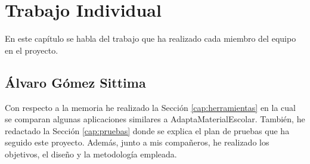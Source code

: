 \chapter{Trabajo Individual}
\label{cap:TrabajoIndividual}

En este capítulo se habla del trabajo que ha realizado cada miembro del equipo en el proyecto.

\section{Álvaro Gómez Sittima}
Con respecto a la memoria he realizado la Sección \ref{cap:herramientas} en la cual se comparan algunas aplicaciones similares a AdaptaMaterialEscolar. También, he redactado la Sección \ref{cap:pruebas} donde se explica el plan de pruebas que ha seguido este proyecto. Además, junto a mis compañeros, he realizado los objetivos, el diseño y la metodología empleada.

